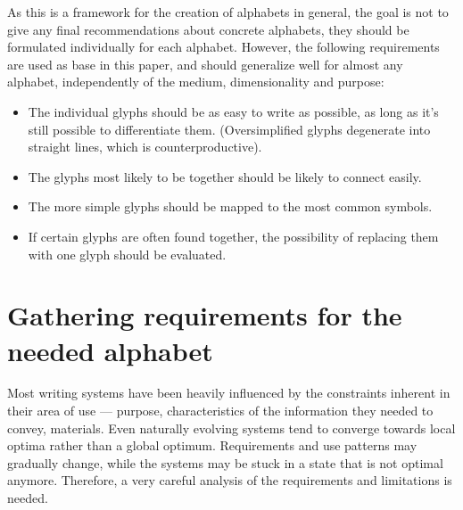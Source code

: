 \documentclass[conference]{IEEEtran}
\begin{document}
As this is a framework for the creation of alphabets in general, the goal is not to give any final recommendations about concrete alphabets, they should be formulated individually for each alphabet. However, the following requirements are used as base in this paper, and should generalize well for almost any alphabet, independently of the medium, dimensionality and purpose:
\begin{itemize}
        \item The individual glyphs should be as easy to write as possible, as long as it's still possible to differentiate them. (Oversimplified glyphs degenerate into straight lines, which is counterproductive).
        \item The glyphs most likely to be together should be likely to connect easily.
        \item The more simple glyphs should be mapped to the most common symbols.
        \item If certain glyphs are often found together, the possibility of replacing them with one glyph should be evaluated.
\end{itemize}

\section{Gathering requirements for the needed alphabet}

Most writing systems have been heavily influenced by the constraints inherent in their area of use ---  purpose, characteristics of the information they needed to convey, materials. Even naturally evolving systems tend to converge towards local optima rather than a global optimum. Requirements and use patterns may gradually change, while the systems may be stuck in a state that is not optimal anymore. Therefore, a very careful analysis of the requirements and limitations is needed.
\end{document}

